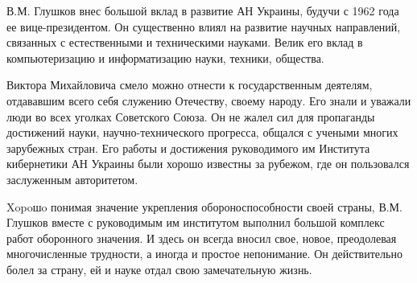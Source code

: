 \documentclass{article}
\begin{document}
В.М. Глушков внес большой вклад в развитие АН Украины, будучи с 1962 года ее
вице-президентом. Он существенно влиял на развитие научных направлений,
связанных с естественными и техническими науками. Велик его вклад в
компьютеризацию и информатизацию науки, техники, общества.

Виктора Михайловича смело можно отнести к государственным деятелям, отдававшим
всего себя служению Отечеству, своему народу. Его знали и уважали люди во всех
уголках Советского Союза. Он не жалел сил для пропаганды достижений науки,
научно-технического прогресса, общался с учеными многих зарубежных стран. Его
работы и достижения руководимого им Института кибернетики АН Украины были хорошо
известны за рубежом, где он пользовался заслуженным авторитетом.

Xopoшo понимая значение укрепления обороноспособности своей страны, В.М. Глушков
вместе с руководимым им институтом выполнил большой комплекс работ оборонного
значения. И здесь он всегда вносил свое, новое, преодолевая многочисленные
трудности, а иногда и простое непонимание. Он действительно болел за страну, ей
и науке отдал свою замечательную жизнь.
\end{document}

